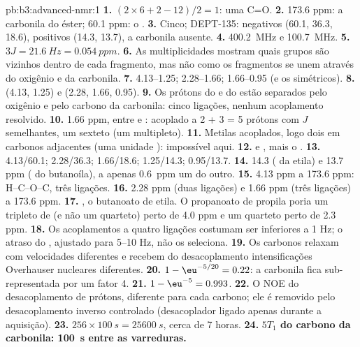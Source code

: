 \begin{solution}{pb:b3:advanced-nmr:1}
\textbf{1.} $(2 \times 6 + 2 - 12)/2 = 1$: uma C=O.
\textbf{2.} 173.6 ppm: a carbonila do éster; 60.1 ppm: o .
\textbf{3.} Cinco; DEPT-135:  negativos (60.1, 36.3, 18.6),  positivos (14.3,
13.7), a carbonila ausente.
\textbf{4.} \qty{400.2}{MHz} e \qty{100.7}{MHz}.
\textbf{5.} $3J = \qty{21.6}{Hz} = \qty{0.054}{ppm}$.
\textbf{6.} As multiplicidades mostram quais grupos são vizinhos dentro de cada
fragmento, mas não como os fragmentos se unem através do oxigênio e da carbonila.
\textbf{7.} 4.13--1.25; 2.28--1.66; 1.66--0.95 (e os simétricos).
\textbf{8.}  (4.13, 1.25) e  (2.28, 1.66, 0.95).
\textbf{9.} Os prótons do  e do  estão separados pelo oxigênio e pelo
carbono da carbonila: cinco ligações, nenhum acoplamento resolvido.
\textbf{10.} 1.66 ppm, entre  e : acoplado a 2 + 3 = 5 prótons com
$J$ semelhantes, um sexteto (um multipleto).
\textbf{11.} Metilas acoplados, logo dois  em carbonos adjacentes (uma unidade ): impossível aqui.
\textbf{12.}  e , mais o .
\textbf{13.} 4.13/60.1; 2.28/36.3; 1.66/18.6; 1.25/14.3; 0.95/13.7.
\textbf{14.} 14.3 ( da etila) e 13.7 ppm ( do butanoíla), a apenas \qty{0.6}{ppm} um do outro.
\textbf{15.} 4.13 ppm a 173.6 ppm: H--C--O--C, três ligações.
\textbf{16.} 2.28 ppm (duas ligações) e 1.66 ppm (três ligações) a 173.6 ppm.
\textbf{17.} , o butanoato de etila. O propanoato de propila poria um
tripleto de  (e não um quarteto) perto de 4.0 ppm e um quarteto perto de 2.3 ppm.
\textbf{18.} Os acoplamentos a quatro ligações costumam ser inferiores a 1 Hz; o atraso do ,
ajustado para 5--10 Hz, não os seleciona.
\textbf{19.} Os carbonos relaxam com velocidades diferentes e recebem do desacoplamento
intensificações Overhauser nucleares diferentes.
\textbf{20.} $1 - \eu^{-5/20} = 0.22$: a carbonila fica sub-representada por um fator 4.
\textbf{21.} $1 - \eu^{-5} = 0.993$.
\textbf{22.} O NOE do desacoplamento de prótons, diferente para cada carbono; ele é removido
pelo desacoplamento inverso controlado (desacoplador ligado apenas durante a aquisição).
\textbf{23.} $256 \times \qty{100}{s} = \qty{25600}{s}$, cerca de 7 horas.
\textbf{24.} \textbf{$5T_1$ do carbono da carbonila: \qty{100}{s} entre as varreduras.}
\end{solution}
